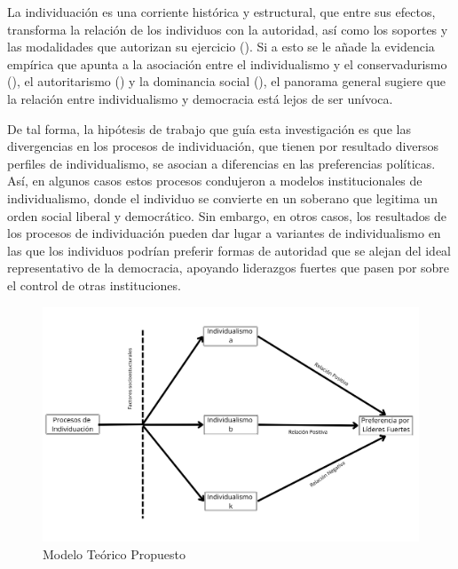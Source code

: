 \documentclass[
  letterpaper,
  DIV=11,
  numbers=noendperiod]{scrartcl}
\begin{document}
La individuación es una corriente histórica y estructural, que entre sus
efectos, transforma la relación de los individuos con la autoridad, así
como los soportes y las modalidades que autorizan su ejercicio
(). Si a esto se le añade la
evidencia empírica que apunta a la asociación entre el individualismo y
el conservadurismo (), el autoritarismo () y la dominancia social (), el panorama general sugiere que la relación entre
individualismo y democracia está lejos de ser unívoca.

De tal forma, la hipótesis de trabajo que guía esta investigación es que
las divergencias en los procesos de individuación, que tienen por
resultado diversos perfiles de individualismo, se asocian a diferencias
en las preferencias políticas. Así, en algunos casos estos procesos
condujeron a modelos institucionales de individualismo, donde el
individuo se convierte en un soberano que legitima un orden social
liberal y democrático. Sin embargo, en otros casos, los resultados de
los procesos de individuación pueden dar lugar a variantes de
individualismo en las que los individuos podrían preferir formas de
autoridad que se alejan del ideal representativo de la democracia,
apoyando liderazgos fuertes que pasen por sobre el control de otras
instituciones.

\begin{figure}[H]

{\centering \includegraphics[width=1\linewidth,height=\textheight,keepaspectratio]{images/hipotesis.png}

}

\caption{Modelo Teórico Propuesto}

\end{figure}%
\end{document}
